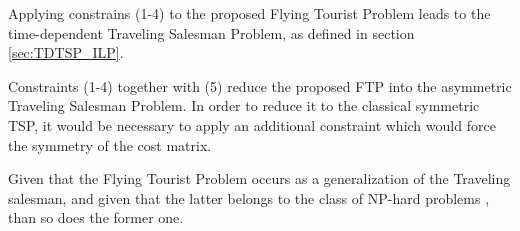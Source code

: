 Applying constrains (1-4) to the proposed Flying Tourist Problem leads to the time-dependent Traveling Salesman Problem, as defined in section \ref{sec:TDTSP_ILP}.

Constraints (1-4) together with (5) reduce the proposed FTP into the asymmetric Traveling Salesman Problem. In order to reduce it to the classical symmetric TSP, it would be necessary to apply an additional constraint which would force the symmetry of the cost matrix.

Given that the Flying Tourist Problem occurs as a generalization of the Traveling salesman, and given that the latter belongs to the class of NP-hard problems \cite{np_completeness}, than so does the former one.



